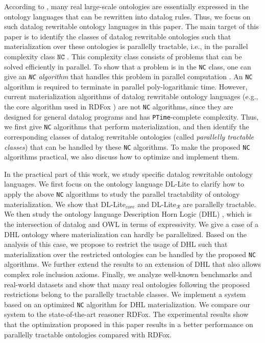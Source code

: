 \documentclass[final,1p,times]{elsarticle}
\begin{document}
According to \cite{MotikNPHO14}, many real large-scale ontologies are essentially expressed in the ontology languages
that can be rewritten into datalog rules. Thus, we focus on such datalog rewritable ontology languages in this paper.
The main target of this paper is to identify the classes of datalog rewritable ontologies such that materialization
over these ontologies is parallelly tractable, i.e., in the parallel complexity class $\texttt{NC}$ \cite{Raymond95}.
This complexity class consists of problems that can be solved efficiently in parallel.
To show that a problem is in the \texttt{NC} class, one can give an \emph{\texttt{NC} algorithm} that handles this problem
in parallel computation \cite{Raymond95}.
An \texttt{NC} algorithm is required to terminate in parallel poly-logarithmic time.
However, current materialization algorithms of datalog rewritable ontology languages
(e.g., the core algorithm used in RDFox \cite{MotikNPHO14}) are not \texttt{NC} algorithms,
since they are designed for general datalog programs and has \texttt{PTime}-complete complexity.
Thus, we first give \texttt{NC} algorithms that perform materialization,
and then identify the corresponding classes of datalog rewritable ontologies (called \emph{parallelly tractable classes})
that can be handled by these \texttt{NC} algorithms. To make the proposed \texttt{NC} algorithms practical,
we also discuss how to optimize and implement them.

In the practical part of this work, we study specific datalog rewritable ontology languages.
We first focus on the ontology language DL-Lite to clarify how to apply the above \texttt{NC} algorithms
to study the parallel tractability of ontology materialization.
We show that DL-Lite$_{core}$ and DL-Lite$_\mathcal{R}$ are parallelly tractable.
We then study the ontology language Description Horn Logic (DHL) \cite{GrosofHVD03}, which is the intersection of datalog and OWL
in terms of expressivity. We give a case of a DHL ontology where materialization can hardly be parallelized.
Based on the analysis of this case, we propose to restrict the usage of DHL such that materialization over the
restricted ontologies can be handled by the proposed \texttt{NC} algorithms.
We further extend the results to an extension of DHL that also allows complex role inclusion axioms.
Finally, we analyze well-known benchmarks and real-world datasets and show that many real ontologies following the
proposed restrictions belong to the parallelly tractable classes.
We implement a system based on an optimized \texttt{NC} algorithm for DHL materialization.
We compare our system to the state-of-the-art reasoner RDFox.
The experimental results show that the optimization proposed in this paper results in a better performance on parallelly
tractable ontologies compared with RDFox.
\end{document}
